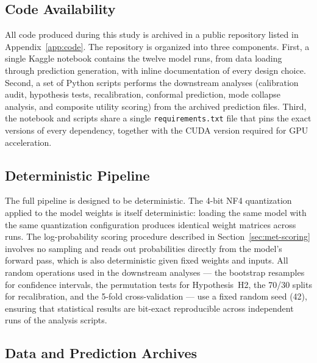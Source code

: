 \subsection{Code Availability}
\label{subsec:met-repro-code}

All code produced during this study is archived in a public repository 
listed in Appendix~\ref{app:code}. The repository is organized into 
three components. First, a single Kaggle notebook contains the twelve 
model runs, from data loading through prediction generation, with 
inline documentation of every design choice. Second, a set of Python 
scripts performs the downstream analyses (calibration audit, hypothesis 
tests, recalibration, conformal prediction, mode collapse analysis, and 
composite utility scoring) from the archived prediction files. Third, 
the notebook and scripts share a single \texttt{requirements.txt} file 
that pins the exact versions of every dependency, together with the 
CUDA version required for GPU acceleration.

\subsection{Deterministic Pipeline}
\label{subsec:met-repro-determinism}

The full pipeline is designed to be deterministic. The 4-bit NF4 
quantization applied to the model weights is itself deterministic: 
loading the same model with the same quantization configuration produces 
identical weight matrices across runs. The log-probability scoring 
procedure described in Section~\ref{sec:met-scoring} involves no 
sampling and reads out probabilities directly from the model's forward 
pass, which is also deterministic given fixed weights and inputs. All 
random operations used in the downstream analyses --- the bootstrap 
resamples for confidence intervals, the permutation tests for 
Hypothesis~H2, the 70/30 splits for recalibration, and the 5-fold 
cross-validation --- use a fixed random seed (42), ensuring that 
statistical results are bit-exact reproducible across independent runs 
of the analysis scripts.

\subsection{Data and Prediction Archives}
\label{subsec:met-repro-data}

